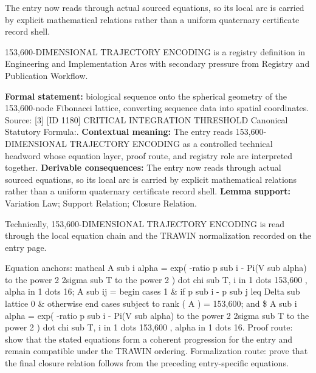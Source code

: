 The entry now reads through actual sourced equations, so its local arc is carried by explicit mathematical relations rather than a uniform quaternary certificate record shell.
\clearpage


\begingroup\small
{}
153,600-DIMENSIONAL TRAJECTORY ENCODING is a registry definition in Engineering and Implementation Arcs with secondary pressure from Registry and Publication Workflow.

\begingroup\footnotesize\setlength{\emergencystretch}{3em}\sloppy
\textbf{Formal statement:} biological sequence onto the spherical geometry of the 153,600-node Fibonacci lattice, converting sequence data into spatial coordinates. Source: [3] [ID 1180] CRITICAL INTEGRATION THRESHOLD Canonical Statutory Formula:. \textbf{Contextual meaning:} The entry reads 153,600-DIMENSIONAL TRAJECTORY ENCODING as a controlled technical headword whose equation layer, proof route, and registry role are interpreted together. \textbf{Derivable consequences:} The entry now reads through actual sourced equations, so its local arc is carried by explicit mathematical relations rather than a uniform quaternary certificate record shell. \textbf{Lemma support:} Variation Law; Support Relation; Closure Relation.\par
\endgroup

Technically, 153,600-DIMENSIONAL TRAJECTORY ENCODING is read through the local equation chain and the TRAWIN normalization recorded on the entry page.

Equation anchors: mathcal A sub i alpha = exp( -ratio p sub i - Pi(V sub alpha) to the power 2 2sigma sub T to the power 2 ) dot chi sub T, i in 1 dots 153,600 , alpha in 1 dots 16; A sub ij = begin cases 1 \& if p sub i - p sub j leq Delta sub lattice 0 \& otherwise end cases subject to rank ( A ) = 153,600; and \$ A sub i alpha = exp( -ratio p sub i - Pi(V sub alpha) to the power 2 2sigma sub T to the power 2 ) dot chi sub T, i in 1 dots 153,600 , alpha in 1 dots 16. Proof route: show that the stated equations form a coherent progression for the entry and remain compatible under the TRAWIN ordering. Formalization route: prove that the final closure relation follows from the preceding entry-specific equations.

